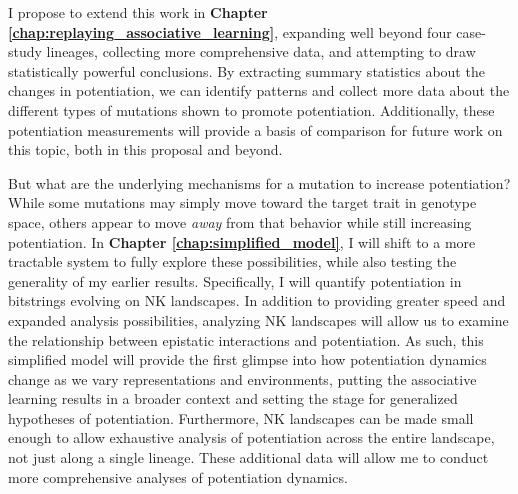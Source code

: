 I propose to extend this work in \textbf{Chapter \ref{chap:replaying_associative_learning}}, expanding well beyond four case-study lineages, collecting more comprehensive data, and attempting to draw statistically powerful conclusions.
By extracting summary statistics about the changes in potentiation, we can identify patterns %
and collect more data
about the different types of mutations shown to promote potentiation.  %
Additionally, these potentiation measurements will provide a basis of comparison for future work on this topic, both in this proposal and beyond.

But what are the underlying mechanisms for a mutation to increase potentiation?
While some mutations may simply move toward the target trait in genotype space, others appear to move \textit{away} from that behavior while still increasing potentiation. 
In \textbf{Chapter \ref{chap:simplified_model}}, I will shift to a more tractable system to fully explore these possibilities, while also testing the generality of my earlier results.
Specifically, I will quantify potentiation in bitstrings evolving on NK landscapes. 
In addition to providing greater speed and expanded analysis possibilities, analyzing NK landscapes will allow us to examine the relationship between epistatic interactions and potentiation. 
As such, this simplified model will provide the first glimpse into how potentiation dynamics change as we vary representations and environments, putting the associative learning results in a broader context and setting the stage for generalized hypotheses of potentiation.
Furthermore, NK landscapes can be made small enough to allow exhaustive analysis of potentiation across the entire landscape, not just along a single lineage.
These additional data will allow me to conduct more comprehensive analyses of potentiation dynamics.


